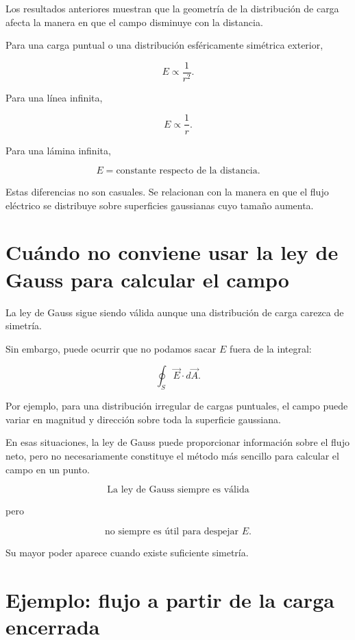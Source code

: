 Los resultados anteriores muestran que la geometría de la distribución de carga afecta
la manera en que el campo disminuye con la distancia.

Para una carga puntual o una distribución esféricamente simétrica exterior,

\[
\boxed{E\propto\frac{1}{r^2}}.
\]

Para una línea infinita,

\[
\boxed{E\propto\frac{1}{r}}.
\]

Para una lámina infinita,

\[
\boxed{E=\text{constante respecto de la distancia}}.
\]

Estas diferencias no son casuales. Se relacionan con la manera en que el flujo eléctrico
se distribuye sobre superficies gaussianas cuyo tamaño aumenta.


\section{Cuándo no conviene usar la ley de Gauss para calcular el campo}

La ley de Gauss sigue siendo válida aunque una distribución de carga carezca de
simetría.

Sin embargo, puede ocurrir que no podamos sacar \(E\) fuera de la integral:

\[
\oint_S\vec E\cdot d\vec A.
\]

Por ejemplo, para una distribución irregular de cargas puntuales, el campo puede variar
en magnitud y dirección sobre toda la superficie gaussiana.

En esas situaciones, la ley de Gauss puede proporcionar información sobre el flujo neto,
pero no necesariamente constituye el método más sencillo para calcular el campo en un
punto.


\begin{idea}

\[
\boxed{\text{La ley de Gauss siempre es válida}}
\]

pero

\[
\boxed{\text{no siempre es útil para despejar }E}.
\]

Su mayor poder aparece cuando existe suficiente simetría.

\end{idea}


\section{Ejemplo: flujo a partir de la carga encerrada}

